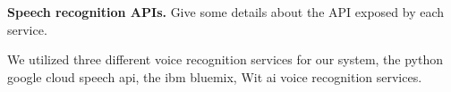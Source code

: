 


\textbf{Speech recognition APIs.} Give some details about the API exposed by each service.

We utilized three different voice recognition services for our system, the python google cloud speech api, 
the ibm bluemix, Wit ai voice recognition services.
